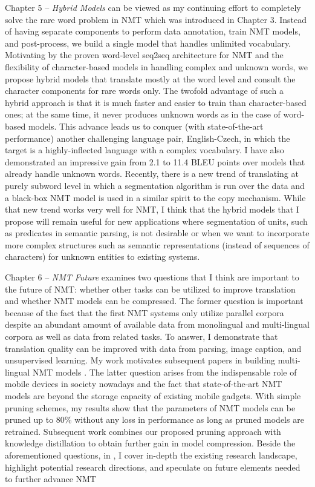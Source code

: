 Chapter 5 -- {\it Hybrid Models} can be viewed as my continuing effort to completely solve the rare word problem in NMT which was introduced in Chapter 3.
Instead of having separate components to perform data annotation, train NMT models, and post-process, we build a single model that handles unlimited vocabulary. Motivating by the proven word-level seq2seq architecture for NMT and the flexibility of character-based models in handling complex and unknown words, we propose hybrid models that translate mostly at the word level and consult the character components for rare words only. The twofold advantage of such a hybrid approach is that it is much faster and easier to train than character-based ones; at the same time, it never produces unknown words as in the case of word-based models. This advance leads us to conquer (with state-of-the-art performance) another challenging language pair, English-Czech, in which the target is a highly-inflected language with a complex vocabulary. I have also demonstrated an impressive gain from 2.1 to 11.4 BLEU points over models that already handle unknown words. Recently, there is a new trend of translating at purely subword level \cite{sennrich16sub,gnmt16} in which a segmentation algorithm is run over the data and a black-box NMT model is used in a similar spirit to the copy mechanism. While that new trend works very well for NMT, I think that the hybrid models that I propose will remain useful for new applications where segmentation of units, such as predicates in semantic parsing, is not desirable or when we want to incorporate more complex structures such as semantic representations (instead of sequences of characters) for unknown entities to existing systems.

Chapter 6 -- {\it NMT Future} examines two questions that I think are important to the future of NMT: whether other tasks can be utilized to improve translation and whether NMT models can be compressed. The former question is important because of the fact that the first NMT systems only utilize parallel corpora despite an abundant amount of available data from monolingual and multi-lingual corpora as well as data from related tasks. To answer, 
I demonstrate that translation quality can be improved with data from parsing, image caption, and unsupervised learning. My work motivates subsequent papers in building multi-lingual NMT models \cite{zoph16,firat16,gnmt16multi,ha16}.
 The latter question arises from the indispensable role of mobile devices in society nowadays and the fact that state-of-the-art NMT models are beyond the storage capacity of existing mobile gadgets. With simple pruning schemes, my results show that the parameters of NMT models can be pruned up to 80\% without any loss in performance as long as pruned models are retrained. Subsequent work \cite{kim16distill} combines our proposed pruning approach with knowledge distillation to obtain further gain in model compression. Beside the aforementioned questions, in , I cover in-depth the existing research landscape, highlight potential research directions, and speculate on future elements needed to further advance NMT 

